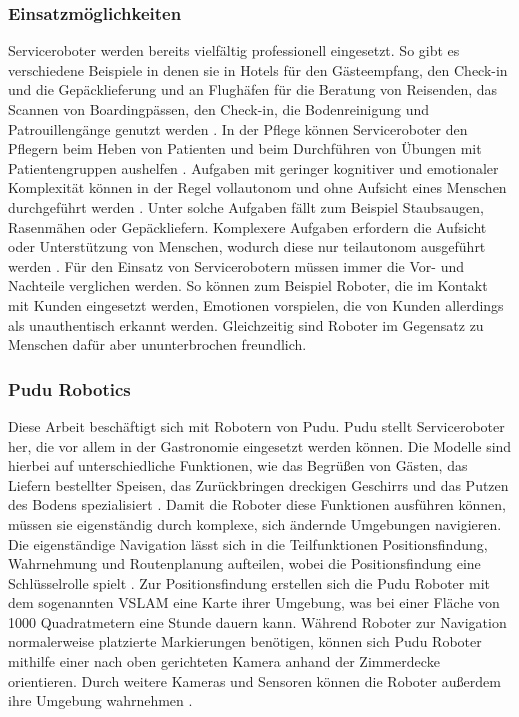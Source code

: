 \subsubsection{Einsatzmöglichkeiten}
Serviceroboter werden bereits vielfältig professionell eingesetzt. So gibt es verschiedene Beispiele in denen sie in Hotels für den Gästeempfang, den Check-in und die Gepäcklieferung und an Flughäfen für die Beratung von Reisenden, das Scannen von Boardingpässen, den Check-in, die Bodenreinigung und Patrouillengänge genutzt werden \cite[S.~425]{Paluch2020}. In der Pflege können Serviceroboter den Pflegern beim Heben von Patienten und beim Durchführen von Übungen mit Patientengruppen aushelfen \cite[S.~427]{Paluch2020}. Aufgaben mit geringer kognitiver und emotionaler Komplexität können in der Regel vollautonom und ohne Aufsicht eines Menschen durchgeführt werden \cite[S.~429]{Paluch2020}. Unter solche Aufgaben fällt zum Beispiel Staubsaugen, Rasenmähen oder Gepäckliefern. Komplexere Aufgaben erfordern die Aufsicht oder Unterstützung von Menschen, wodurch diese nur teilautonom ausgeführt werden \cite[S.~430-431]{Paluch2020}. Für den Einsatz von Servicerobotern müssen immer die Vor- und Nachteile verglichen werden. So können zum Beispiel Roboter, die im Kontakt mit Kunden eingesetzt werden, Emotionen vorspielen, die von Kunden allerdings als unauthentisch erkannt werden. Gleichzeitig sind Roboter im Gegensatz zu Menschen dafür aber ununterbrochen freundlich.\cite[S.~427]{Paluch2020}

\subsubsection{Pudu Robotics}
Diese Arbeit beschäftigt sich mit Robotern von Pudu. Pudu stellt Serviceroboter her, die vor allem in der Gastronomie eingesetzt werden können. Die Modelle sind hierbei auf unterschiedliche Funktionen, wie das Begrüßen von Gästen, das Liefern bestellter Speisen, das Zurückbringen dreckigen Geschirrs und das Putzen des Bodens spezialisiert \cite{PUDU2024}. Damit die Roboter diese Funktionen ausführen können, müssen sie eigenständig durch komplexe, sich ändernde Umgebungen navigieren. Die eigenständige Navigation lässt sich in die Teilfunktionen Positionsfindung, Wahrnehmung und Routenplanung aufteilen, wobei die Positionsfindung eine Schlüsselrolle spielt \cite{Nature2022}. Zur Positionsfindung erstellen sich die Pudu Roboter mit dem sogenannten \ac{VSLAM} eine Karte ihrer Umgebung, was bei einer Fläche von 1000 Quadratmetern eine Stunde dauern kann. Während Roboter zur Navigation normalerweise platzierte Markierungen benötigen, können sich Pudu Roboter mithilfe einer nach oben gerichteten Kamera anhand der Zimmerdecke orientieren.\cite{Pudu2023} Durch weitere Kameras und Sensoren können die Roboter außerdem ihre Umgebung wahrnehmen \cite{Nature2022}.

